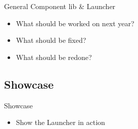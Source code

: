 \begin{frame}{General Component lib \& Launcher}
\begin{itemize}
  \item What should be worked on next year?
  \item What should be fixed?
  \item What should be redone?
\end{itemize}
\end{frame}

\subsection{Showcase}
\begin{frame}{Showcase}
\begin{itemize}
  \item Show the Launcher in action
\end{itemize}
\end{frame}
